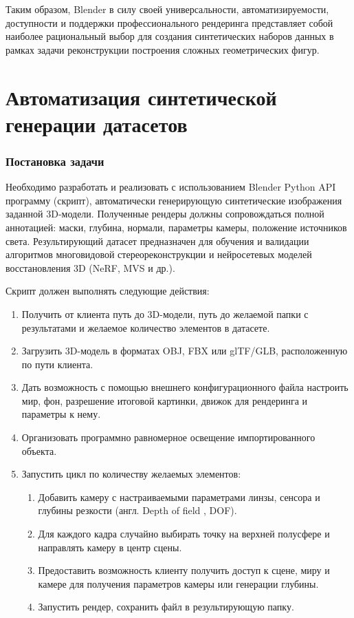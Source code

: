 Таким образом, Blender в силу своей универсальности, автоматизируемости,
доступности и поддержки профессионального рендеринга представляет собой наиболее
рациональный выбор для создания синтетических наборов данных в рамках задачи
реконструкции построения сложных геометрических фигур.

\section{Автоматизация синтетической генерации датасетов}

\subsubsection{Постановка задачи}
Необходимо разработать и реализовать с использованием Blender Python API программу (скрипт),
автоматически генерирующую синтетические изображения заданной 3D-модели.
Полученные рендеры должны сопровождаться полной аннотацией: маски, глубина,
нормали, параметры камеры, положение источников света. Результирующий датасет
предназначен для обучения и валидации алгоритмов многовидовой
стереореконструкции и нейросетевых моделей восстановления 3D (NeRF, MVS и др.).

\noindent Скрипт должен выполнять следующие действия:
\begin{enumerate}
  \item Получить от клиента путь до 3D-модели, путь до желаемой папки с
  результатами и желаемое количество элементов в датасете.
  \item Загрузить 3D-модель в форматах OBJ, FBX или glTF/GLB, расположенную по пути клиента.
  \item Дать возможность с помощью внешнего конфигурационного файла настроить
  мир, фон, разрешение итоговой картинки, движок для рендеринга и параметры к
  нему.
  \item Организовать программно равномерное освещение импортированного объекта.
  \item Запустить цикл по количеству желаемых элементов:
  \begin{enumerate}
    \item Добавить камеру с настраиваемыми параметрами линзы, сенсора и
    глубины резкости (англ. Depth of field , DOF).
    \item Для каждого кадра случайно выбирать точку на верхней полусфере и
    направлять камеру в центр сцены.
    \item Предоставить возможность клиенту получить доступ к сцене, миру и
    камере для получения параметров камеры или генерации глубины.
    \item Запустить рендер, сохранить файл в результирующую папку.
  \end{enumerate}
\end{enumerate}

